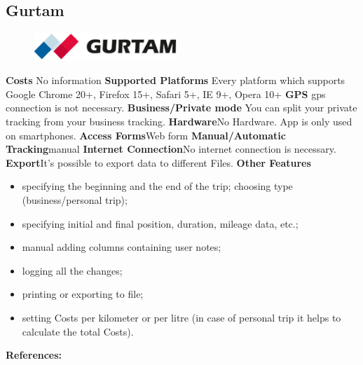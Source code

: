 \begin{singlespace}
\section{Gurtam}
\begin{figure}
  \begin{center}
    \includegraphics[width=0.48\textwidth]{bilder/gurtam}
  \end{center}
\end{figure}
\textbf{Costs} No information 
\newline\newline
\textbf{Supported Platforms} Every platform which supports  Google Chrome 20+, Firefox 15+, Safari 5+, IE 9+, Opera 10+
\newline\newline
\textbf{GPS} \gls{gps} connection is not necessary.
\newline\newline
\textbf{Business/Private mode} You can split your private tracking from your business tracking.
\newline\newline
\textbf{Hardware}No Hardware. App is only used on smartphones.
\newline\newline
\textbf{Access Forms}Web form
\newline\newline
\textbf{Manual/Automatic Tracking}manual
\newline\newline
\textbf{Internet Connection}No internet connection is necessary.
\newline\newline
\textbf{Export}It’s possible to export data to different Files.
\newline\newline
\textbf{Other Features}
\begin{itemize}
\item specifying the beginning and the end of the trip;
choosing type (business/personal trip);
\item specifying initial and final position, duration, mileage data, etc.;
\item manual adding columns containing user notes;
\item logging all the changes;
\item printing or exporting to file;
\item setting Costs per kilometer or per litre (in case of personal trip it helps to calculate the total Costs).
\end{itemize}
\textbf{References:} \cite{Gurtam_Wialon_Driving_Logbook}
\newpage


\end{singlespace}
